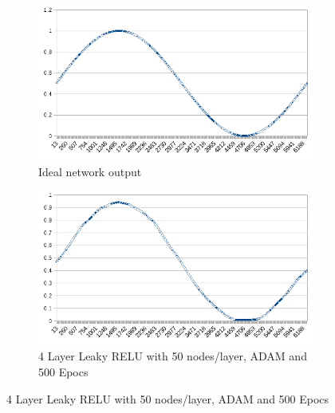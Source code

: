 \documentclass[12pt]{article}
\begin{document}
\begin{figure}
\begin{subfigure}{.5\textwidth}
  \centering
  \includegraphics[width=.8\linewidth]{./images/sineApproximation/idealOutput.png}
  \caption{Ideal network output}
\end{subfigure}%
\begin{subfigure}{.5\textwidth}
  \centering
  \includegraphics[width=.8\linewidth]{./images/sineApproximation/Adam50Node4LayerLeakyRELU300Batch500Iter.png}
  \caption{4 Layer Leaky RELU with 50 nodes/layer, ADAM and 500 Epocs}


\end{subfigure}
\end{figure}
\end{document}
